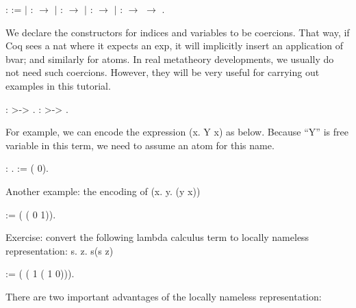 \documentclass[12pt]{report}
\begin{document}
\begin{coqdoccode}
\coqdocemptyline
\coqdocnoindent
{}  :  :=\coqdoceol
\coqdocindent{1.00em}
\ensuremath{|}  :  \ensuremath{\rightarrow} \coqdoceol
\coqdocindent{1.00em}
\ensuremath{|}  :  \ensuremath{\rightarrow} \coqdoceol
\coqdocindent{1.00em}
\ensuremath{|}   :  \ensuremath{\rightarrow} \coqdoceol
\coqdocindent{1.00em}
\ensuremath{|}   :  \ensuremath{\rightarrow}  \ensuremath{\rightarrow} .\coqdoceol
\coqdocemptyline
\end{coqdoccode}
We declare the constructors for indices and variables to be coercions. 
    That way, if Coq sees a nat where it expects an exp, it will implicitly 
    insert an application of bvar; and similarly for atoms. In real metatheory
    developments, we usually do not need such coercions. However, they will
    be very useful for carrying out examples in this tutorial. 

\begin{coqdoccode}
\coqdocemptyline
\coqdocnoindent
{}  :  >-> .\coqdoceol
\coqdocnoindent
{}  :  >-> .\coqdoceol
\coqdocemptyline
\end{coqdoccode}
For example, we can encode the expression (x. Y x) as below.
    Because ``Y'' is free variable in this term, we need to assume an atom 
    for this name.
 
\begin{coqdoccode}
\coqdocemptyline
\coqdocnoindent
{}  : .\coqdoceol
\coqdocnoindent
{}  :=  (  0).\coqdoceol
\coqdocemptyline
\end{coqdoccode}
Another example: the encoding of (x. y. (y x)) 
\begin{coqdoccode}
\coqdocemptyline
\coqdocnoindent
{}  :=  ( ( 0 1)).\coqdoceol
\coqdocemptyline
\end{coqdoccode}
Exercise: convert the following lambda calculus term to locally 
    nameless representation: s. z. s(s z) 
\begin{coqdoccode}
\coqdocemptyline
\coqdocnoindent
{}  :=  ( ( 1 ( 1 0))).\coqdoceol
\coqdocemptyline
\end{coqdoccode}
There are two important advantages of the locally nameless
    representation:
\end{document}
